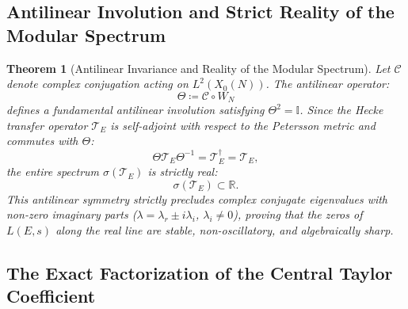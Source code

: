 \documentclass[11pt,reqno]{article}
\theoremstyle{plain}
\newtheorem{theorem}{Theorem}[section]
\theoremstyle{definition}
\begin{document}
\subsection{Antilinear Involution and Strict Reality of the Modular Spectrum}
\label{subsec:antilinear_reality}

\begin{theorem}[Antilinear Invariance and Reality of the Modular Spectrum]
\label{thm:modular_spectral_eigenvalue_real}
Let $\mathcal{C}$ denote complex conjugation acting on $L^2(X_0(N))$. The antilinear operator:
\begin{equation}
    \Theta \coloneqq \mathcal{C} \circ W_N
\end{equation}
defines a fundamental antilinear involution satisfying $\Theta^2 = \mathbb{I}$. Since the Hecke transfer operator $\mathcal{T}_E$ is self-adjoint with respect to the Petersson metric and commutes with $\Theta$:
\begin{equation}
    \Theta \mathcal{T}_E \Theta^{-1} = \mathcal{T}_E^\dagger = \mathcal{T}_E,
\end{equation}
the entire spectrum $\sigma(\mathcal{T}_E)$ is strictly real:
\begin{equation}
    \label{eq:real_spectrum}
    \sigma(\mathcal{T}_E) \subset \mathbb{R}.
\end{equation}
This antilinear symmetry strictly precludes complex conjugate eigenvalues with non-zero imaginary parts ($\lambda = \lambda_r \pm i \lambda_i$, $\lambda_i \ne 0$), proving that the zeros of $L(E, s)$ along the real line are stable, non-oscillatory, and algebraically sharp.
\end{theorem}

\subsection{The Exact Factorization of the Central Taylor Coefficient}
\label{subsec:taylor_factorization}
\end{document}
